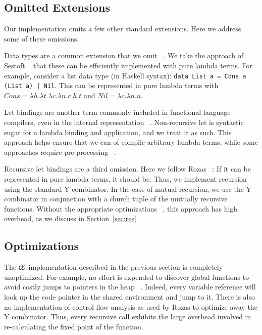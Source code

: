 \subsection{Omitted Extensions}

Our implementation omits a few other standard extensions. Here we address some
of these omissions.

Data types are a common extension that we omit ~\cite{jonesstg,boquist1997grin}.
We take the approach of Sestoft ~\cite{sestoft} that these can be efficiently
implemented with pure lambda terms. For example, consider a list data type (in
Haskell syntax): \texttt{data List a = Cons a (List a) | Nil}. This can be
represented in pure lambda terms with $Cons = \lambda h.\lambda t.\lambda
c.\lambda n.c \; h \; t$ and $Nil = \lambda c.\lambda n.n$. 

Let bindings are another term commonly included in functional language
compilers, even in the internal representation ~\cite{boquist1997grin,jonesstg}.
Non-recursive let is syntactic sugar for a lambda binding and application, and
we treat it as such. This approach helps ensure that we can of
compile arbitrary lambda terms, while some approaches require pre-processing
~\cite{sestoft,TIM}.

Recursive let bindings are a third omission. Here we follow Rozas
~\cite{rozas1992taming}: If it can be represented in pure lambda terms, it should
be. Thus, we implement recursion using the standard Y combinator. In the case of
mutual recursion, we use the Y combinator in conjunction with a church tuple of
the mutually recursive functions. Without the appropriate optimizations
~\cite{rozas1992taming}, this approach has high overhead, as we discuss in
Section~\ref{sec:res}.

\subsection{Optimizations}

The $\mathcal{C} \mskip -4mu \mathcal{E}$ implementation described in the previous section is 
completely unoptimized. For example, no effort is expended to
discover global functions to avoid costly jumps to pointers in the heap
~\cite{jonesstg}. Indeed, every variable reference will look up the code pointer
in the shared environment and jump to it. There is also no implementation of 
control flow analysis as used by Rozas to optimize away the Y combinator.  Thus,
every recursive call exhibits the large overhead involved in re-calculating the
fixed point of the function.  

